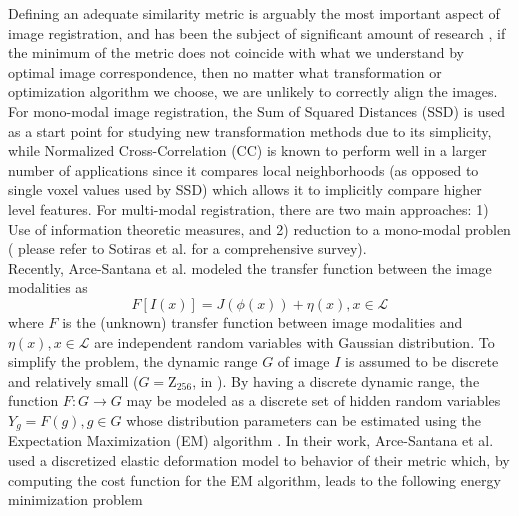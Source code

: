 Defining an adequate similarity metric is arguably the most important aspect of image registration, and has been the subject of significant amount of research \cite{Sotiras2013}, if
the minimum of the metric does not coincide with what we understand by optimal image correspondence, then no matter what transformation or optimization algorithm we choose, we are
unlikely to correctly align the images. For mono-modal image registration, the Sum of Squared Distances (SSD) is used as a start point for studying new transformation methods due to
its simplicity, while Normalized Cross-Correlation (CC) is known to perform well in a larger number of applications since it compares local neighborhoods (as opposed to single
voxel values used by SSD) which allows it to implicitly compare higher level features. For multi-modal registration, there are two main approaches: 1) Use of information theoretic
measures, and 2) reduction to a mono-modal problen ( please refer to Sotiras et al. \cite{Sotiras2013} for a comprehensive survey).\\

Recently, Arce-Santana et al. \cite{Arce-santana2014} modeled the transfer function between the image modalities as
\begin{equation}\label{eq:arce_model}
    F[I(x)] = J(\phi(x)) + \eta(x), x\in \mathcal{L}
\end{equation}
where $F$ is the (unknown) transfer function between image modalities and $\eta(x), x\in \mathcal{L}$ are independent random variables with Gaussian distribution. To simplify
the problem, the dynamic range $G$ of image $I$ is assumed to be discrete and relatively small ($G = \mathrm{Z}_{256}$, in \cite{Arce-santana2014}). By having a discrete
dynamic range, the function $F: G \rightarrow G$ may be modeled as a discrete set of hidden random variables $Y_g = F(g), g\in G$ whose distribution parameters
can be estimated using the Expectation Maximization (EM) algorithm \cite{Dempster1977}. In their work, Arce-Santana et al. \cite{Arce-santana2014} used a discretized elastic
deformation model to behavior of their metric which, by computing the cost function for the EM algorithm, leads to the following energy minimization problem

